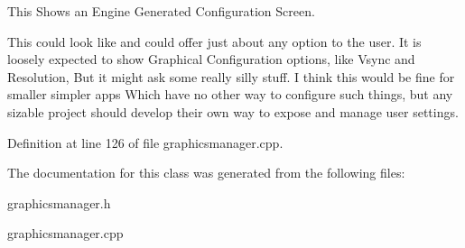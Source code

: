 This Shows an Engine Generated Configuration Screen. 

This could look like and could offer just about any option to the user. It is loosely expected to show Graphical Configuration options, like Vsync and Resolution, But it might ask some really silly stuff. I think this would be fine for smaller simpler apps Which have no other way to configure such things, but any sizable project should develop their own way to expose and manage user settings. 

Definition at line 126 of file graphicsmanager.cpp.



The documentation for this class was generated from the following files:\begin{DoxyCompactItemize}
\item 
graphicsmanager.h\item 
graphicsmanager.cpp\end{DoxyCompactItemize}
